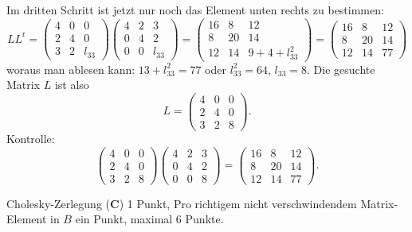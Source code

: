 \begin{loesung}
Im dritten Schritt ist jetzt nur noch das Element unten rechts zu bestimmen:
\[
LL^t=
\begin{pmatrix}
4&0&     0\\
2&4&     0\\
3&2&l_{33}
\end{pmatrix}
\begin{pmatrix}
4&2&     3\\
0&4&     2\\
0&0&l_{33}
\end{pmatrix}
=
\begin{pmatrix}
16& 8& 12\\
 8&20& 14\\
12&14&9+4+l_{33}^2
\end{pmatrix}
=
\begin{pmatrix}
16& 8& 12\\
 8&20& 14\\
12&14& 77
\end{pmatrix}
\]
woraus man ablesen kann: $13+l_{33}^2=77$ oder $l_{33}^2=64$, $l_{33}=8$.
Die gesuchte Matrix $L$ ist also
\[
L=
\begin{pmatrix}
4&0&0\\
2&4&0\\
3&2&8
\end{pmatrix}.
\]
Kontrolle:
\[
\begin{pmatrix}
4&0&0\\
2&4&0\\
3&2&8
\end{pmatrix}
\begin{pmatrix}
4&2&3\\
0&4&2\\
0&0&8
\end{pmatrix}
=
\begin{pmatrix}
16& 8& 12\\
 8&20& 14\\
12&14& 77
\end{pmatrix}.
\]
\end{loesung}

\begin{bewertung}
Cholesky-Zerlegung ({\bf C}) 1 Punkt,
Pro richtigem nicht verschwindendem Matrix-Element in $B$ ein Punkt,
maximal 6 Punkte.
\end{bewertung}

